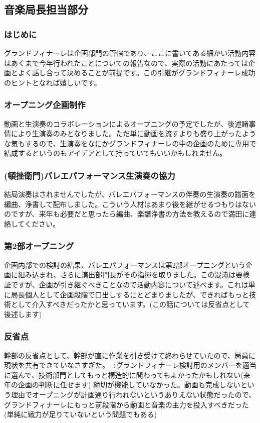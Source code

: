 \documentclass[a4paper]{ltjsreport}
\begin{document}
\subsection{音楽局長担当部分}
\subsubsection{はじめに}
グランドフィナーレは企画部門の管轄であり、ここに書いてある細かい活動内容はあくまで今年行われたことについての報告なので、実際の活動にあたっては企画とよく話し合って決めることが前提です。この引継がグランドフィナーレ成功のヒントとなれば嬉しいです。
\subsubsection{オープニング企画制作}
動画と生演奏のコラボレーションによるオープニングの予定でしたが、後述諸事情により生演奏のみとなりました。ただ単に動画を流すよりも盛り上がったような気もするので、生演奏をなにかグランドフィナーレの中の企画のために専用で結成するというのもアイデアとして持っていてもいいかもしれません。
\subsubsection{(頓挫衛門)バレエパフォーマンス生演奏の協力}
結局演奏はされませんでしたが、バレエパフォーマンスの伴奏の生演奏の譜面を編曲、浄書して配布しました。こういう人材はあまり後を継がせるつもりはないのですが、来年も必要だと思ったら編曲、楽譜浄書の方法を教えるので満田に連絡してください。
\subsubsection{第2部オープニング}
企画内部での検討の結果、バレエパフォーマンスは第2部オープニングという企画に組み込まれ、さらに演出部門長がその指揮を取りました。この混沌は要検証ですが、企画が引き継ぐべきことなので活動内容について述べます。これは単に局長個人として企画段階で口出しするにとどまりましたが、できればもっと技術として介入すべきだったかと思っています。(この話については反省点として後述します)
\subsubsection{反省点}
幹部の反省点として、幹部が直に作業を引き受けて終わらせていたので、局員に現状を共有できていなさすぎた。→グランドフィナーレ検討用のメンバーを適当に選んで、技術部門としてもっと構造的に関わってもよかったかもしれない(来年の企画の判断に任せます)
締切が機能していなかった。動画も完成しないという理由でオープニングが計画通り行われないというありえない状態だったので、グランドフィナーレにもっと前段階から動画と音楽の主力を投入すべきだった(単純に戦力が足りていないという問題でもある)
\end{document}
